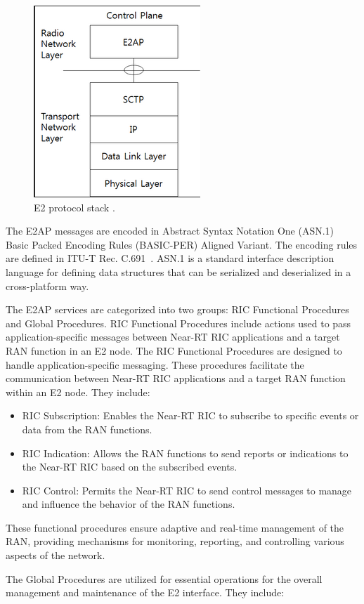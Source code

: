 \begin{figure}[H]
    \centering
    \includegraphics[width=0.3\linewidth]{figures/E2_stack}
    \caption[E2 protocol stack]{E2 protocol stack \cite{E2GAP}.}
    \label{fig:E2_stack}
\end{figure}

The E2AP messages are encoded in Abstract Syntax Notation One (ASN.1) Basic Packed Encoding Rules (BASIC-PER) Aligned Variant.
The encoding rules are defined in ITU-T Rec.
C.691~\cite{ITU_T_C691}.
ASN.1 is a standard interface description language for defining data structures that can be serialized and deserialized in a cross-platform way.

The E2AP services are categorized into two groups: RIC Functional Procedures and Global Procedures.
RIC Functional Procedures include actions used to pass application-specific messages between Near-RT RIC applications and a target RAN function in an E2 node.
The RIC Functional Procedures are designed to handle application-specific messaging.
These procedures facilitate the communication between Near-RT RIC applications and a target RAN function within an E2 node.
They include:

\begin{itemize}
\item RIC Subscription: Enables the Near-RT RIC to subscribe to specific events or data from the RAN functions.
\item RIC Indication: Allows the RAN functions to send reports or indications to the Near-RT RIC based on the subscribed events.
\item RIC Control: Permits the Near-RT RIC to send control messages to manage and influence the behavior of the RAN functions.
\end{itemize}
These functional procedures ensure adaptive and real-time management of the RAN, providing mechanisms for monitoring, reporting, and controlling various aspects of the network.

The Global Procedures are utilized for essential operations for the overall management and maintenance of the E2 interface.
They include:

